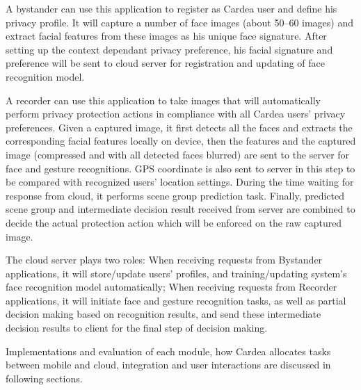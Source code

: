 \begin{description}[leftmargin=0cm]
  \item[{\bfseries Bystander client application:}] A bystander can use this application to register as Cardea user and define his privacy profile. It will capture a number of face images (about 50--60 images) and extract facial features from these images as his unique face signature. After setting up the context dependant privacy preference, his facial signature and preference will be sent to cloud server for registration and updating of face recognition model.
  \item[{\bfseries Recorder client application:}] A recorder can use this application to take images that will automatically perform privacy protection actions in compliance with all Cardea users' privacy preferences. Given a captured image, it first detects all the faces and extracts the corresponding facial features locally on device, then the features and the captured image (compressed and with all detected faces blurred) are sent to the server for face and gesture recognitions. GPS coordinate is also sent to server in this step to be compared with recognized users' location settings. During the time waiting for response from cloud, it performs scene group prediction task. Finally, predicted scene group and intermediate decision result received from server are combined to decide the actual protection action which will be enforced on the raw captured image.
  \item[{\bfseries Cloud server:}] The cloud server plays two roles:  When receiving requests from Bystander applications, it will store/update users' profiles, and training/updating system's face recognition model automatically;  When receiving requests from Recorder applications, it will initiate face and gesture recognition tasks, as well as partial decision making based on recognition results, and send these intermediate decision results to client for the final step of decision making.
\end{description}


Implementations and evaluation of each module, how Cardea allocates tasks between mobile and cloud, integration and user interactions are discussed in following sections.

